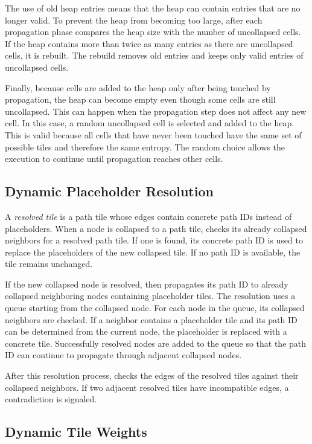 \documentclass[../../main.tex]{subfiles}
\begin{document}
The use of old heap entries means that the heap can contain entries that are no longer valid. To prevent the heap from becoming too large, after each propagation phase \wassis compares the heap size with the number of uncollapsed cells. If the heap contains more than twice as many entries as there are uncollapsed cells, it is rebuilt. The rebuild removes old entries and keeps only valid entries of uncollapsed cells.

Finally, because cells are added to the heap only after being touched by propagation, the heap can become empty even though some cells are still uncollapsed. This can happen when the propagation step does not affect any new cell. In this case, a random uncollapsed cell is selected and added to the heap. This is valid because all cells that have never been touched have the same set of possible tiles and therefore the same entropy. The random choice allows the execution to continue until propagation reaches other cells.

\subsection{Dynamic Placeholder Resolution}

A \emph{resolved tile} is a path tile whose edges contain concrete path IDs instead of placeholders. When a node is collapsed to a path tile, \wassis checks its already collapsed neighbors for a resolved path tile. If one is found, its concrete path ID is used to replace the placeholders of the new collapsed tile. If no path ID is available, the tile remains unchanged.

If the new collapsed node is resolved, \wassis then propagates its path ID to already collapsed neighboring nodes containing placeholder tiles. The resolution uses a queue starting from the collapsed node. For each node in the queue, its collapsed neighbors are checked. If a neighbor contains a placeholder tile and its path ID can be determined from the current node, the placeholder is replaced with a concrete tile. Successfully resolved nodes are added to the queue so that the path ID can continue to propagate through adjacent collapsed nodes.

After this resolution process, \wassis checks the edges of the resolved tiles against their collapsed neighbors. If two adjacent resolved tiles have incompatible edges, a contradiction is signaled.

\subsection{Dynamic Tile Weights}
\end{document}
